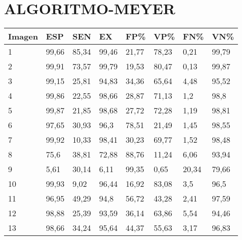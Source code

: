 \section{ALGORITMO-MEYER}
\begin{longtable}[c]{|l|l|l|l|l|l|l|l|}
\hline
\textbf{Imagen} & \textbf{ESP} & \textbf{SEN} & \textbf{EX} & \textbf{FP\%} & \textbf{VP\%} & \textbf{FN\%} & \textbf{VN\%} \\ \hline
\endhead
%
1               & 99,66        & 85,34        & 99,46       & 21,77         & 78,23         & 0,21          & 99,79         \\ \hline
2               & 99,91        & 73,57        & 99,79       & 19,53         & 80,47         & 0,13          & 99,87         \\ \hline
3               & 99,15        & 25,81        & 94,83       & 34,36         & 65,64         & 4,48          & 95,52         \\ \hline
4               & 99,86        & 22,55        & 98,66       & 28,87         & 71,13         & 1,2           & 98,8          \\ \hline
5               & 99,87        & 21,85        & 98,68       & 27,72         & 72,28         & 1,19          & 98,81         \\ \hline
6               & 97,65        & 30,93        & 96,3        & 78,51         & 21,49         & 1,45          & 98,55         \\ \hline
7               & 99,92        & 10,33        & 98,41       & 30,23         & 69,77         & 1,52          & 98,48         \\ \hline
8               & 75,6         & 38,81        & 72,88       & 88,76         & 11,24         & 6,06          & 93,94         \\ \hline
9               & 5,61         & 30,14        & 6,11        & 99,35         & 0,65          & 20,34         & 79,66         \\ \hline
10              & 99,93        & 9,02         & 96,44       & 16,92         & 83,08         & 3,5           & 96,5          \\ \hline
11              & 96,95        & 49,29        & 94,8        & 56,72         & 43,28         & 2,41          & 97,59         \\ \hline
12              & 98,88        & 25,39        & 93,59       & 36,14         & 63,86         & 5,54          & 94,46         \\ \hline
13              & 98,66        & 34,24        & 95,64       & 44,37         & 55,63         & 3,17          & 96,83         \\ \hline

\end{longtable}
